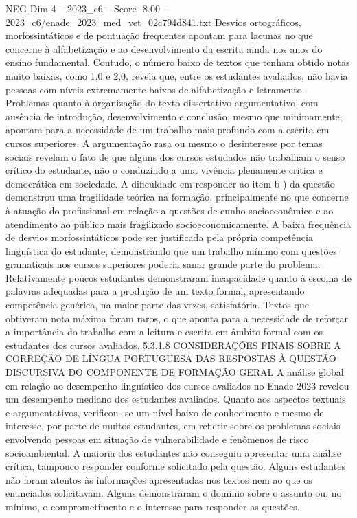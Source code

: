 \begin{textsample}{NEG Dim 4 – 2023\_c6 – Score -8.00 – 2023\_c6/enade\_2023\_med\_vet\_02c794d841.txt}
Desvios ortográficos, morfossintáticos e de pontuação frequentes apontam para lacunas no que concerne à alfabetização e ao desenvolvimento da escrita ainda nos anos do ensino fundamental.
Contudo, o número baixo de textos que tenham obtido notas muito baixas, como 1,0 e 2,0, revela que, entre os estudantes avaliados, não havia pessoas com níveis extremamente baixos de alfabetização e letramento.
Problemas quanto à organização do texto dissertativo-argumentativo, com ausência de introdução, desenvolvimento e conclusão, mesmo que minimamente, apontam para a necessidade de um trabalho mais profundo com a escrita em cursos superiores.
A argumentação rasa ou mesmo o desinteresse por temas sociais revelam o fato de que alguns dos cursos estudados não trabalham o senso crítico do estudante, não o conduzindo a uma vivência plenamente crítica e democrática em sociedade.
A dificuldade em responder ao item b ) da questão demonstrou uma fragilidade teórica na formação, principalmente no que concerne à atuação do profissional em relação a questões de cunho socioeconômico e ao atendimento ao público mais fragilizado socioeconomicamente.
A baixa frequência de desvios morfossintáticos pode ser justificada pela própria competência linguística do estudante, demonstrando que um trabalho mínimo com questões gramaticais nos cursos superiores poderia sanar grande parte do problema.
Relativamente poucos estudantes demonstraram incapacidade quanto à escolha de palavras adequadas para a produção de um texto formal, apresentando competência genérica, na maior parte das vezes, satisfatória.
Textos que obtiveram nota máxima foram raros, o que aponta para a necessidade de reforçar a importância do trabalho com a leitura e escrita em âmbito formal com os estudantes dos cursos avaliados. 5.3.1.8 CONSIDERAÇÕES FINAIS SOBRE A CORREÇÃO DE LÍNGUA PORTUGUESA DAS RESPOSTAS À QUESTÃO DISCURSIVA DO COMPONENTE DE FORMAÇÃO GERAL A análise global em relação ao desempenho linguístico dos cursos avaliados no Enade 2023 revelou um desempenho mediano dos estudantes avaliados.
Quanto aos aspectos textuais e argumentativos, verificou -se um nível baixo de conhecimento e mesmo de interesse, por parte de muitos estudantes, em refletir sobre os problemas sociais envolvendo pessoas em situação de vulnerabilidade e fenômenos de risco socioambiental.
A maioria dos estudantes não conseguiu apresentar uma análise crítica, tampouco responder conforme solicitado pela questão.
Alguns estudantes não foram atentos às informações apresentadas nos textos nem ao que os enunciados solicitavam.
Alguns demonstraram o domínio sobre o assunto ou, no mínimo, o comprometimento e o interesse para responder as questões.

\end{textsample}
